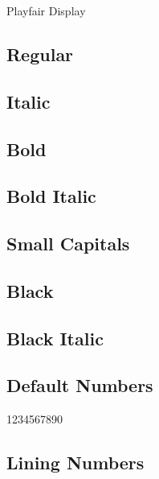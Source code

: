 \documentclass{article}
\begin{document}
\begin{center}\playfairblack\huge Playfair Display
\end{center}

\subsection*{Regular}
\lipsum[1]

\subsection*{Italic}
\textit{\lipsum[2]}


\subsection*{Bold}
\textbf{\lipsum[3]}

\subsection*{Bold Italic}

\textbf{\textit{\lipsum[4]}}


\subsection*{Small Capitals}

\textsc{\lipsum[5]}

\subsection*{Black}

{\playfairblack\lipsum[7]}


\subsection*{Black Italic}

\textit{\playfairblack\lipsum[8]}

\subsection*{Default Numbers}

1234567890

\subsection*{Lining Numbers}

{}
\end{document}
